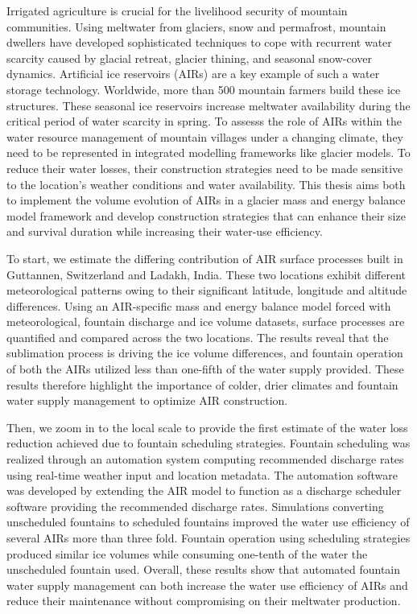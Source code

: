 %
\label{sec:abstract}

Irrigated agriculture is crucial for the livelihood security of mountain communities. Using meltwater from
glaciers, snow and permafrost, mountain dwellers have developed sophisticated techniques to cope with recurrent
water scarcity caused by glacial retreat, glacier thining, and seasonal snow-cover dynamics. Artificial ice
reservoirs (AIRs) are a key example of such a water storage technology. Worldwide, more than 500 mountain
farmers build these ice structures. These seasonal ice reservoirs increase meltwater availability during the
critical period of water scarcity in spring. To assesss the role of AIRs within the water resource management of
mountain villages under a changing climate, they need to be represented in integrated modelling frameworks like
glacier models. To reduce their water losses, their construction strategies need to be made sensitive to the
location's weather conditions and water availability. This thesis aims both to implement the volume evolution of
AIRs in a glacier mass and energy balance model framework and develop construction strategies that can enhance
their size and survival duration while increasing their water-use efficiency. 

To start, we estimate the differing contribution of AIR surface processes built in Guttannen, Switzerland and
Ladakh, India. These two locations exhibit different meteorological patterns owing to their significant
latitude, longitude and altitude differences. Using an AIR-specific mass and energy balance model forced with
meteorological, fountain discharge and ice volume datasets, surface processes are quantified and compared across
the two locations. The results reveal that the sublimation process is driving the ice volume differences, and
fountain operation of both the AIRs utilized less than one-fifth of the water supply provided. These results
therefore highlight the importance of colder, drier climates and fountain water supply management to optimize
AIR construction.  

Then, we zoom in to the local scale to provide the first estimate of the water loss reduction achieved due to
fountain scheduling strategies. Fountain scheduling was realized through an automation system computing
recommended discharge rates using real-time weather input and location metadata. The automation software was
developed by extending the AIR model to function as a discharge scheduler software providing the recommended discharge
rates. Simulations converting unscheduled fountains to scheduled fountains improved the water use efficiency of
several AIRs more than three fold. Fountain operation using scheduling strategies produced similar ice volumes
while consuming one-tenth of the water the unscheduled fountain used.  Overall, these results show that
automated fountain water supply management can both increase the water use efficiency of AIRs and reduce their
maintenance without compromising on their meltwater production.

